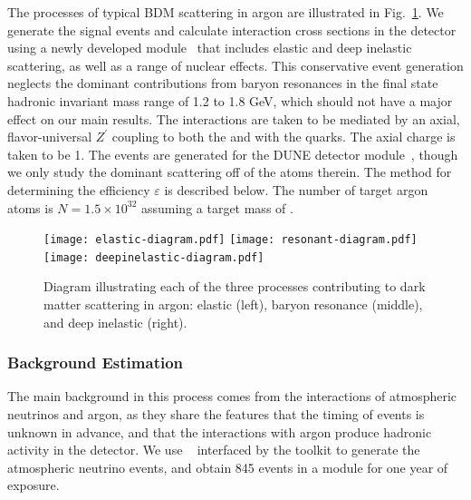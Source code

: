 The processes of typical BDM scattering in argon are illustrated in Fig.~\ref{fig:BDM-argon}.
We generate the signal events and calculate interaction cross sections in the detector using a newly developed  module~\cite{Andreopoulos:2009rq,Andreopoulos:2015wxa,Berger:2018} that includes elastic and deep inelastic scattering, as well as a range of nuclear effects. This conservative event generation neglects the dominant contributions from baryon resonances in the final state hadronic invariant mass range of 1.2 to 1.8 GeV, which should not have a major effect on our main results. The interactions are taken to be mediated by an axial, flavor-universal $Z^\prime$ coupling to both the  and with the quarks. The axial charge is taken to be 1. 
The events are generated for the \nominalmodsize DUNE detector module~\cite{dunetpc_code}, though we only study the dominant scattering off of the  atoms therein. The method for determining the efficiency $\varepsilon$ is described below. The number of target argon atoms is $N = 1.5  \times 10^{32}$ assuming a target mass of \nominalmodsize{}.

\begin{figure}[h!]
  \centering
  \texttt{[image: elastic-diagram.pdf]}
  \texttt{[image: resonant-diagram.pdf]}
  \texttt{[image: deepinelastic-diagram.pdf]}
  \caption{Diagram illustrating each of the three processes contributing to dark matter scattering in argon: elastic (left), baryon resonance (middle), and deep inelastic (right).}
  \label{fig:BDM-argon}
\end{figure}
\subsubsection{Background Estimation}
\label{sec:background}

The main background in this process comes from the  
interactions of atmospheric neutrinos and argon,
as they share the features that the timing of events is unknown in advance,
and that the interactions with argon produce hadronic activity in the detector.
We use ~\cite{Andreopoulos:2009rq,Andreopoulos:2015wxa}
interfaced by the  toolkit to generate the  atmospheric
neutrino events, and obtain 845 events in a \nominalmodsize{} module for one year of
exposure.

